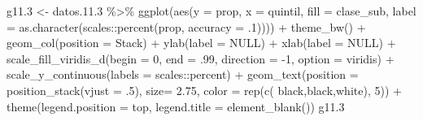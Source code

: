 \documentclass[
  12pt,
]{book}
\newenvironment{Shaded}{\begin{snugshade}}{\end{snugshade}}
\newcommand{\AttributeTok}[1]{\textcolor[rgb]{0.77,0.63,0.00}{#1}}
\newcommand{\ConstantTok}[1]{\textcolor[rgb]{0.00,0.00,0.00}{#1}}
\newcommand{\DecValTok}[1]{\textcolor[rgb]{0.00,0.00,0.81}{#1}}
\newcommand{\FloatTok}[1]{\textcolor[rgb]{0.00,0.00,0.81}{#1}}
\newcommand{\FunctionTok}[1]{\textcolor[rgb]{0.00,0.00,0.00}{#1}}
\newcommand{\NormalTok}[1]{#1}
\newcommand{\OtherTok}[1]{\textcolor[rgb]{0.56,0.35,0.01}{#1}}
\newcommand{\SpecialCharTok}[1]{\textcolor[rgb]{0.00,0.00,0.00}{#1}}
\newcommand{\StringTok}[1]{\textcolor[rgb]{0.31,0.60,0.02}{#1}}
\begin{document}
\begin{Shaded}
\begin{Highlighting}[]
\NormalTok{g11}\FloatTok{.3} \OtherTok{\textless{}{-}} 
\NormalTok{  datos.}\FloatTok{11.3} \SpecialCharTok{\%\textgreater{}\%} 
  \FunctionTok{ggplot}\NormalTok{(}\FunctionTok{aes}\NormalTok{(}\AttributeTok{y =}\NormalTok{ prop, }\AttributeTok{x =}\NormalTok{ quintil, }\AttributeTok{fill =}\NormalTok{ clase\_sub, }
             \AttributeTok{label =} \FunctionTok{as.character}\NormalTok{(scales}\SpecialCharTok{::}\FunctionTok{percent}\NormalTok{(prop, }\AttributeTok{accuracy =}\NormalTok{ .}\DecValTok{1}\NormalTok{)))) }\SpecialCharTok{+} 
  \FunctionTok{theme\_bw}\NormalTok{() }\SpecialCharTok{+} 
  \FunctionTok{geom\_col}\NormalTok{(}\AttributeTok{position =} \StringTok{\textquotesingle{}Stack\textquotesingle{}}\NormalTok{) }\SpecialCharTok{+}
  \FunctionTok{ylab}\NormalTok{(}\AttributeTok{label =} \ConstantTok{NULL}\NormalTok{) }\SpecialCharTok{+}
  \FunctionTok{xlab}\NormalTok{(}\AttributeTok{label =} \ConstantTok{NULL}\NormalTok{) }\SpecialCharTok{+}
  \FunctionTok{scale\_fill\_viridis\_d}\NormalTok{(}\AttributeTok{begin =} \DecValTok{0}\NormalTok{, }\AttributeTok{end =}\NormalTok{ .}\DecValTok{99}\NormalTok{, }\AttributeTok{direction =} \SpecialCharTok{{-}}\DecValTok{1}\NormalTok{, }\AttributeTok{option =} \StringTok{\textquotesingle{}viridis\textquotesingle{}}\NormalTok{) }\SpecialCharTok{+}
  \FunctionTok{scale\_y\_continuous}\NormalTok{(}\AttributeTok{labels =}\NormalTok{ scales}\SpecialCharTok{::}\NormalTok{percent) }\SpecialCharTok{+} 
  \FunctionTok{geom\_text}\NormalTok{(}\AttributeTok{position =} \FunctionTok{position\_stack}\NormalTok{(}\AttributeTok{vjust =}\NormalTok{ .}\DecValTok{5}\NormalTok{),}
            \AttributeTok{size=} \FloatTok{2.75}\NormalTok{, }\AttributeTok{color =} \FunctionTok{rep}\NormalTok{(}\FunctionTok{c}\NormalTok{( }\StringTok{\textquotesingle{}black\textquotesingle{}}\NormalTok{,}\StringTok{\textquotesingle{}black\textquotesingle{}}\NormalTok{,}\StringTok{\textquotesingle{}white\textquotesingle{}}\NormalTok{), }\DecValTok{5}\NormalTok{)) }\SpecialCharTok{+} 
  \FunctionTok{theme}\NormalTok{(}\AttributeTok{legend.position =} \StringTok{\textquotesingle{}top\textquotesingle{}}\NormalTok{,}
        \AttributeTok{legend.title =} \FunctionTok{element\_blank}\NormalTok{())}
\NormalTok{g11}\FloatTok{.3}
\end{Highlighting}
\end{Shaded}
\end{document}
